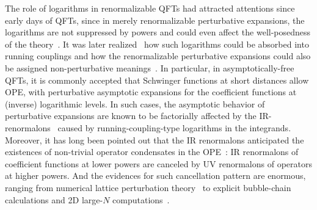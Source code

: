 \documentclass[a4paper,11pt]{article}
\begin{document}
The role of logarithms in renormalizable QFTs had attracted attentions since early days of QFTs, since in merely renormalizable perturbative expansions, the logarithms are not suppressed by powers and could even affect the well-posedness of the theory~\cite{PhysRev.95.1300}. It was later realized~\cite{PhysRevD.2.1541,PhysRevLett.30.1343,PhysRevLett.30.1346} how such logarithms could be absorbed into running couplings and how the renormalizable perturbative expansions could also be assigned non-perturbative meanings~\cite{PhysRevLett.34.1227,Gawedzki:1984pj,Gawedzki:1985ic,Gawedzki:1985ez,Feldman:1986ax,Slade_2015}. In particular, in asymptotically-free QFTs, it is commonly accepted that Schwinger functions at short distances allow OPE, with perturbative asymptotic expansions for the coefficient functions at (inverse) logarithmic levels. In such cases, the asymptotic behavior of perturbative expansions are known to be factorially affected by the IR-renormalons~\cite{tHooft:1977xjm,Parisi:1978az,Parisi:1978bj} caused by running-coupling-type logarithms in the integrands. Moreover, it has long been pointed out that the IR renormalons anticipated the existences of non-trivial operator condensates in the OPE~\cite{Parisi:1978az,Novikov:1980uj, Shifman:1978bx,David:1983gz,David:1985xj, Novikov:1984rf,Mueller:1984vh,Ji:1994md,Beneke:1998ui,Beneke:1998eq,Braun:2004bu,Shifman:2013uka,Dunne:2015eoa}: IR renormalons of coefficient functions at lower powers are canceled by UV renormalons of operators at higher powers. And the evidences for such cancellation pattern are enormous, ranging from numerical lattice perturbation theory~\cite{Bauer:2011ws,Bali:2014fea} to explicit bubble-chain calculations and 2D large-$N$ computations~\cite{David:1982qv,David:1983gz,David:1985xj,Beneke:1998eq,Braun:2004bu,Marino:2024uco,Liu:2024omb}. 
\end{document}
